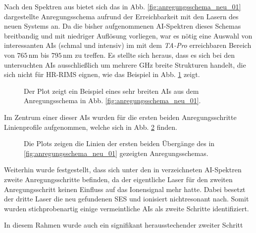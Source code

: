 Nach den Spektren aus \cite{raeder:2011:dissertation} bietet sich das in Abb.
\ref{fig:anregungsschema_neu_01} dargestellte Anregungsschema aufrund der
Erreichbarkeit mit den Lasern des neuen Systems an. Da die bisher
aufgenommenen AI-Spektren dieses Schemas breitbandig und mit niedriger Auflösung vorliegen, war es nötig eine Auswahl von
interessanten AIs (schmal und intensiv) im mit dem \textit{TA-Pro} erreichbaren
Bereich von $765\,$nm bis $795\,$nm zu treffen. Es stellte
sich heraus, dass es sich bei den untersuchten AIs ausschließlich um mehrere GHz
breite Strukturen handelt, die sich nicht für HR-RIMS eignen, wie das Beispiel
in Abb. \ref{fig:linienscans_neues_schema_01_AI_bsp} zeigt.
\begin{figure}[h]
 	\centering
 	\footnotesize
	
	\caption[AI Beispiel @ xxxx, neues Schema (1)]{Der Plot zeigt ein
	Beispiel eines sehr breiten AIs aus dem Anregungsschema in Abb.
	\ref{fig:anregungsschema_neu_01}.}
	\label{fig:linienscans_neues_schema_01_AI_bsp}
\end{figure}
Im Zentrum einer dieser AIs wurden für die ersten beiden Anregungsschritte
Linienprofile aufgenommen, welche sich in Abb. \ref{fig:linienscans_neues_schema_01} finden.
\begin{figure}[hp]
 	\centering
 	\footnotesize
	\caption[erster und zweiter Anregungsschritt, neues System, Schema (1)]{Die
	Plots zeigen die Linien der ersten beiden Übergänge des in
	\ref{fig:anregungsschema_neu_01} gezeigten Anregungsschemas.}
	\label{fig:linienscans_neues_schema_01}
\end{figure}
Weiterhin wurde festgestellt, dass sich unter den in
\cite{raeder:2011:dissertation} verzeichneten AI-Spektren zweite
Anregungsschritte befinden, da der eigentliche Laser für den
zweiten Anregungsschritt keinen Einfluss auf das Ionensignal mehr hatte. Dabei
besetzt der dritte Laser die neu gefundenen SES und
ionisiert nichtresonant nach. Somit wurden stichprobenartig einige
vermeintliche AIs als zweite Schritte identifiziert.\par
In diesem Rahmen wurde auch ein signifikant herausstechender zweiter Schritt
